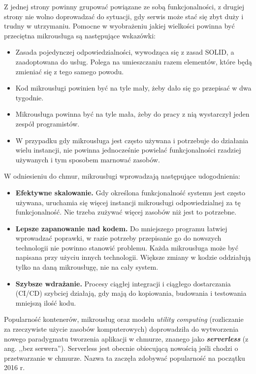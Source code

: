 \documentclass[12pt,a4paper,twoside,titlepage,openright]{book}
\begin{document}
Z jednej strony powinny grupować powiązane ze sobą funkcjonalności, z drugiej strony nie wolno doprowadzać do sytuacji, gdy serwis może stać się zbyt duży i trudny w utrzymaniu. Pomocne w wyobrażeniu jakiej wielkości powinna być przeciętna mikrousługa są następujące wskazówki:
\begin{itemize}
\item Zasada pojedynczej odpowiedzialności, wywodząca się z zasad SOLID, a zaadoptowana do usług. Polega na umieszczaniu razem elementów, które będą zmieniać się z tego samego powodu. \cite{microservicesWmii}
\item Kod mikrousługi powinien być na tyle mały, żeby dało się go przepisać w dwa tygodnie. \cite{microservicesWmii}
\item Mikrousługa powinna być na tyle mała, żeby do pracy z nią wystarczył jeden zespół programistów. \cite{microservicesSusan}
\item W przypadku gdy mikrousługa jest często używana i potrzebuje do działania wielu instancji, nie powinna jednocześnie powielać funkcjonalności rzadziej używanych i tym sposobem marnować zasobów. \cite{microservicesSusan}
\end{itemize}

W odniesieniu do chmur, mikrousługi wprowadzają następujące udogodnienia: \cite{microservicesPacktNetCore, microservicesSusan, microservicesWmii}
\begin{itemize}
\item \textbf{Efektywne skalowanie.} Gdy określona funkcjonalność systemu jest często używana, uruchamia się więcej instancji mikrousługi odpowiedzialnej za tę funkcjonalność. Nie trzeba zużywać więcej zasobów niż jest to potrzebne.
\item \textbf{Lepsze zapanowanie nad kodem.} Do mniejszego programu łatwiej wprowadzać poprawki, w razie potrzeby przepisanie go do nowszych technologii nie powinno stanowić problemu. Każda mikrousługa może być napisana przy użyciu innych technologii. Większe zmiany w kodzie oddziałują tylko na daną mikrousługę, nie na cały system.
\item \textbf{Szybsze wdrażanie.} Procesy ciągłej integracji i ciągłego dostarczania (CI/CD) szybciej działają, gdy mają do kopiowania, budowania i testowania mniejszą ilość kodu. 
\end{itemize}

Popularność kontenerów, mikrousług oraz modelu \textit{utility computing} (rozliczanie za rzeczywiste użycie zasobów komputerowych) doprowadziła do wytworzenia nowego paradygmatu tworzenia aplikacji w chmurze, znanego jako \textbf{\textit{serverless}} (z ang. ,,bez serwera''). Serverless jest obecnie obiecującą nowością jeśli chodzi o przetwarzanie w chmurze. Nazwa ta zaczęła zdobywać popularność na początku 2016 r. \cite{ccResearchSpringer}  
\end{document}
